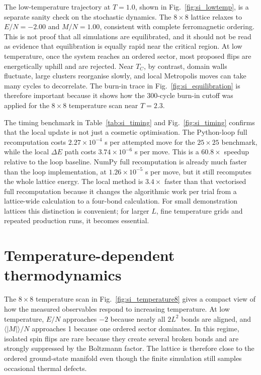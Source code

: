 \documentclass[twoside,twocolumn,9pt]{extarticle}
\begin{document}
The low-temperature trajectory at \(T=1.0\), shown in Fig.~\ref{fig:si_lowtemp}, is a separate sanity check on the stochastic dynamics. The \(8 \times 8\) lattice relaxes to \(E/N=-2.00\) and \(M/N=1.00\), consistent with complete ferromagnetic ordering. This is not proof that all simulations are equilibrated, and it should not be read as evidence that equilibration is equally rapid near the critical region. At low temperature, once the system reaches an ordered sector, most proposed flips are energetically uphill and are rejected. Near \(T_C\), by contrast, domain walls fluctuate, large clusters reorganise slowly, and local Metropolis moves can take many cycles to decorrelate. The burn-in trace in Fig.~\ref{fig:si_equilibration} is therefore important because it shows how the 300-cycle burn-in cutoff was applied for the \(8 \times 8\) temperature scan near \(T=2.3\).

The timing benchmark in Table~\ref{tab:si_timing} and Fig.~\ref{fig:si_timing} confirms that the local update is not just a cosmetic optimisation. The Python-loop full recomputation costs \(2.27\times10^{-4}\) s per attempted move for the \(25 \times 25\) benchmark, while the local \(\Delta E\) path costs \(3.74\times10^{-6}\) s per move. This is a \(60.8\times\) speedup relative to the loop baseline. NumPy full recomputation is already much faster than the loop implementation, at \(1.26\times10^{-5}\) s per move, but it still recomputes the whole lattice energy. The local method is \(3.4\times\) faster than that vectorised full recomputation because it changes the algorithmic work per trial from a lattice-wide calculation to a four-bond calculation. For small demonstration lattices this distinction is convenient; for larger \(L\), fine temperature grids and repeated production runs, it becomes essential.

\section{Temperature-dependent thermodynamics}

The \(8 \times 8\) temperature scan in Fig.~\ref{fig:si_temperature8} gives a compact view of how the measured observables respond to increasing temperature. At low temperature, \(E/N\) approaches \(-2\) because nearly all \(2L^2\) bonds are aligned, and \(\langle |M|\rangle/N\) approaches 1 because one ordered sector dominates. In this regime, isolated spin flips are rare because they create several broken bonds and are strongly suppressed by the Boltzmann factor. The lattice is therefore close to the ordered ground-state manifold even though the finite simulation still samples occasional thermal defects.
\end{document}
